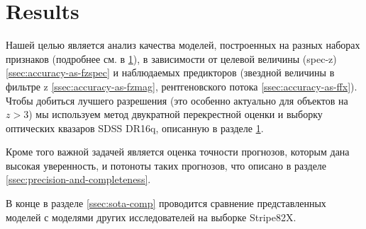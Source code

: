 \documentclass[fleqn,usenatbib]{mnras}
\begin{document}

\section{Results}

Нашей целью является анализ качества моделей, построенных на разных наборах признаков (подробнее см. в \ref{}), в зависимости от целевой величины (spec-z) \ref{ssec:accuracy-as-fzspec} и наблюдаемых предикторов (звездной величины в фильтре z \ref{ssec:accuracy-as-fzmag}, рентгеновского потока \ref{ssec:accuracy-as-ffx}). Чтобы добиться лучшего разрешения (это особенно актуально для объектов на $z > 3$) мы используем метод двукратной перекрестной оценки и выборку оптических квазаров SDSS DR16q, описанную в разделе \ref{}.

Кроме того важной задачей является оценка точности прогнозов, которым дана высокая уверенность, и потоноты таких прогнозов, что описано в разделе \ref{ssec:precision-and-completeness}.

В конце в разделе \ref{ssec:sota-comp} проводится сравнение представленных моделей с моделями других исследователей на выборке Stripe82X.


\end{document}
